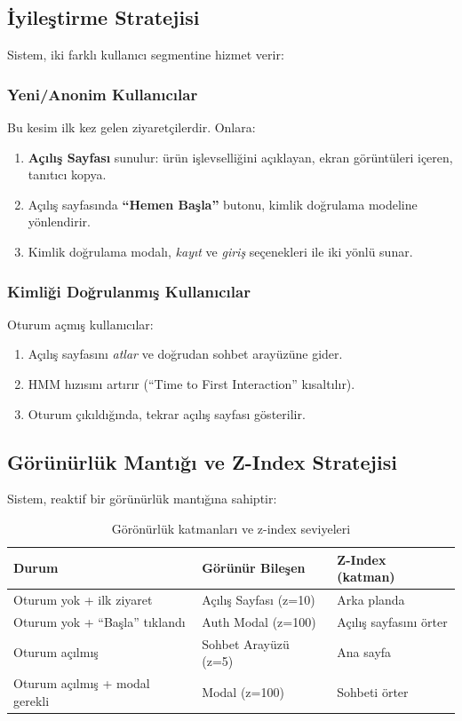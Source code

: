 \documentclass[12pt,a4paper]{article}
\begin{document}
\subsection{İyileştirme Stratejisi}

Sistem, iki farklı kullanıcı segmentine hizmet verir:

\subsubsection{Yeni/Anonim Kullanıcılar}
Bu kesim ilk kez gelen ziyaretçilerdir. Onlara:
\begin{enumerate}[leftmargin=*]
  \item \textbf{Açılış Sayfası} sunulur: ürün işlevselliğini açıklayan, ekran görüntüleri içeren, tanıtıcı kopya.
  \item Açılış sayfasında \textbf{``Hemen Başla''} butonu, kimlik doğrulama modeline yönlendirir.
  \item Kimlik doğrulama modalı, \textit{kayıt} ve \textit{giriş} seçenekleri ile iki yönlü sunar.
\end{enumerate}

\subsubsection{Kimliği Doğrulanmış Kullanıcılar}
Oturum açmış kullanıcılar:
\begin{enumerate}[leftmargin=*]
  \item Açılış sayfasını \textit{atlar} ve doğrudan sohbet arayüzüne gider.
  \item HMM hızısını artırır (``Time to First Interaction'' kısaltılır).
  \item Oturum çıkıldığında, tekrar açılış sayfası gösterilir.
\end{enumerate}

\subsection{Görünürlük Mantığı ve Z-Index Stratejisi}

Sistem, reaktif bir görünürlük mantığına sahiptir:

\begin{table}[h!]
  \centering\small
  \begin{tabular}{@{} P{2.8cm} P{3.5cm} P{4cm} @{}}
    \toprule
    Durum & Görünür Bileşen & Z-Index (katman) \\
    \midrule
    Oturum yok + ilk ziyaret & Açılış Sayfası (z=10) & Arka planda \\
    Oturum yok + ``Başla'' tıklandı & Auth Modal (z=100) & Açılış sayfasını örter \\
    Oturum açılmış & Sohbet Arayüzü (z=5) & Ana sayfa \\
    Oturum açılmış + modal gerekli & Modal (z=100) & Sohbeti örter \\
    \bottomrule
  \end{tabular}
  \caption{Görönürlük katmanları ve z-index seviyeleri}
\end{table}
\end{document}
